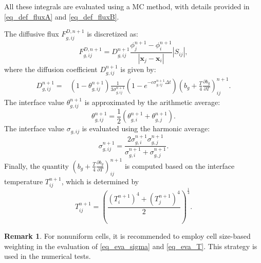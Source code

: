 \documentclass[preprint,12pt]{elsarticle}
\theoremstyle{definition}
\newtheorem{remark}{Remark}[section]
\theoremstyle{plain}
\numberwithin{equation}{section}
\numberwithin{algorithm}{section}
\newcounter{eq_count}
\newcounter{thm_count}
\newcommand{\half}{\frac{1}{2}}
\newcommand{\vr}{\mathbf{x}}
\newcommand{\vx}{\mathbf{x}}
\newcommand{\dd}{{\text{d}}}
\newcommand{\pdrv}[2]{\frac{\partial{#1}}{\partial{#2}}}
\begin{document}
    All these integrals are evaluated using a MC method, with details provided in \eqref{eq_def_fluxA} and \eqref{eq_def_fluxB}. 

    The diffusive flux $F^{D,n+1}_{g,ij}$ is discretized as:
    \begin{equation} \label{eq_def_diffusiveFLux}
        F^{D,n+1}_{g,ij} = D_{g,ij}^{n+1}\frac{\phi_{j}^{n+1} - \phi_i^{n+1}}{ |\vr_j - \vr_i| }|S_{ij}|,
    \end{equation}
    where the diffusion coefficient $D_{g,ij}^{n+1}$ is given by:
    \begin{equation}          \label{eq_fulldis_fluxB}
        \begin{aligned}  
            D_{g,ij}^{n+1} =&  ( 1 - \theta_{g,ij}^{n+1}  ) \frac{1 }{3\sigma_{g,ij}^{n+1}}(1-e^{-c \sigma_{g,ij}^{n+1}\Delta t}) (b_g + \frac{T}{4} \pdrv{b_g}{T})^{n+1}_{ij}.
        \end{aligned}
    \end{equation}
The interface value $\theta_{g,ij}^{n+1}$ is approximated by the arithmetic average:
\begin{equation}
    \theta_{g,ij}^{n+1} = \half(\theta_{g,i}^{n+1} + \theta_{g,j}^{n+1}   ).
\end{equation}
 The interface value $\sigma_{g,ij}$ is evaluated using the harmonic average:
    \begin{equation}\label{eq_eva_sigma} 
        \sigma_{g,ij}^{n+1} = \frac{2 \sigma_{g,i}^{n+1} \sigma_{g,j}^{n+1}}{\sigma_{g,i}^{n+1}  + \sigma_{g,j}^{n+1} }.
    \end{equation}
Finally, the quantity $(b_g + \frac{T}{4} \pdrv{b_g}{T})^{n+1}_{ij}$ is computed  based on the interface temperature 
 $T^{n+1}_{ij}$, which is determined by
    \begin{equation} \label{eq_eva_T}
        T^{n+1}_{ij} = \left(\frac{(T^{n+1}_{i})^4 + (T^{n+1}_{j})^4}{2}  \right)^{\frac{1}{4}} .
    \end{equation}
    \begin{remark}
        For nonuniform cells, it is recommended to employ cell size-based weighting in the evaluation of \eqref{eq_eva_sigma} and \eqref{eq_eva_T}. This strategy is used in the numerical tests.
    \end{remark}
\end{document}
